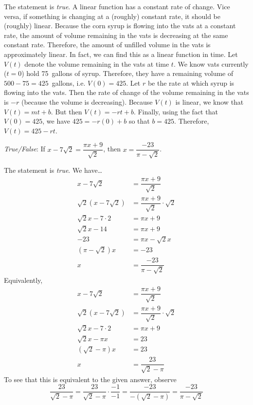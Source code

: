 \documentclass[11pt,letterpaper]{article}
\begin{document}
\sol The statement is \textit{true}. A linear function has a constant rate of change. Vice versa, if something is changing at a (roughly) constant rate, it should be (roughly) linear. Because the corn syrup is flowing into the vats at a constant rate, the amount of volume remaining in the vats is decreasing at the same constant rate. Therefore, the amount of unfilled volume in the vats is approximately linear. In fact, we can find this as a linear function in time. Let $V(t)$ denote the volume remaining in the vats at time $t$. We know vats currently ($t= 0$) hold 75~gallons of syrup. Therefore, they have a remaining volume of $500 - 75= 425$~gallons, i.e. $V(0)= 425$. Let $r$ be the rate at which syrup is flowing into the vats. Then the rate of change of the volume remaining in the vats is $-r$ (because the volume is decreasing). Because $V(t)$ is linear, we know that $V(t)= mt + b$. But then $V(t)= -rt + b$. Finally, using the fact that $V(0)= 425$, we have $425= -r(0) + b$ so that $b= 425$. Therefore, $V(t)= 425 - rt$. \pvspace{1.3cm}



\newpage



\quizsol \textit{True/False}: If $x - 7 \sqrt{2}= \dfrac{\pi x + 9}{\sqrt{2}}$, then $x= \dfrac{-23}{\pi - \sqrt{2}}$. \pspace

\sol The statement is \textit{true}. We have\dots
	\[
	\begin{aligned}
	x - 7 \sqrt{2}&= \dfrac{\pi x + 9}{\sqrt{2}} \\
	\sqrt{2} (x - 7\sqrt{2})&= \dfrac{\pi x + 9}{\sqrt{2}} \cdot \sqrt{2} \\
	\sqrt{2}x - 7 \cdot 2&= \pi x + 9 \\
	\sqrt{2}x - 14&= \pi x + 9 \\
	-23&= \pi x - \sqrt{2} x \\
	(\pi - \sqrt{2})x&= -23 \\
	x&= \dfrac{-23}{\pi - \sqrt{2}}
	\end{aligned}
	\]
Equivalently, 
	\[
	\begin{aligned}
	x - 7 \sqrt{2}&= \dfrac{\pi x + 9}{\sqrt{2}} \\
	\sqrt{2} (x - 7\sqrt{2})&= \dfrac{\pi x + 9}{\sqrt{2}} \cdot \sqrt{2} \\
	\sqrt{2}x - 7 \cdot 2&= \pi x + 9 \\
	\sqrt{2}x - \pi x&= 23 \\
	(\sqrt{2} - \pi) x&= 23 \\
	x&= \dfrac{23}{\sqrt{2} - \pi}
	\end{aligned}
	\]
To see that this is equivalent to the given answer, observe
	\[
	\dfrac{23}{\sqrt{2} - \pi}= \dfrac{23}{\sqrt{2} - \pi} \cdot \dfrac{-1}{-1}= \dfrac{-23}{-(\sqrt{2} - \pi)}= \dfrac{-23}{\pi - \sqrt{2}}
	\] \pvspace{1.5cm}
\end{document}
